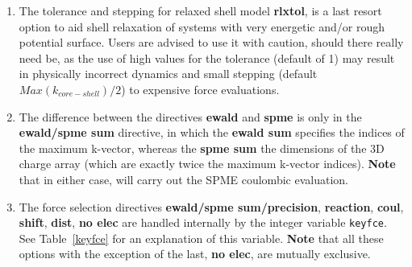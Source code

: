 \begin{enumerate}
\item The tolerance and stepping for relaxed shell model {\bf rlxtol},
is a last resort option to aid shell relaxation of systems with very
energetic and/or rough potential surface.  Users are advised to use
it with caution, should there really need be, as the use of high values
for the tolerance (default of 1) may result in physically incorrect
dynamics and small stepping (default $Max(k_{core-shell})/2$) to
expensive force evaluations.

\item The difference between the directives {\bf ewald} and {\bf spme}
is only in the {\bf ewald/spme sum} directive, in which the
{\bf ewald sum} specifies the indices of the maximum k-vector, whereas
the {\bf spme sum} the dimensions of the 3D charge array
(which are exactly twice the maximum k-vector indices).  {\bf Note}
that in either case, \D will carry out the
SPME coulombic evaluation.

\item The force selection directives
{\bf ewald/spme sum/precision},
{\bf reaction}, {\bf coul}, {\bf shift}, {\bf dist}, {\bf no elec}
are handled internally by the integer variable {\tt keyfce}.
See Table~\ref{keyfce} for an explanation of this variable.
{\bf Note} that all these options with the exception of the last,
{\bf no elec}, are mutually exclusive.

\begin{table}[htbp]
\end{table}


\end{enumerate}

